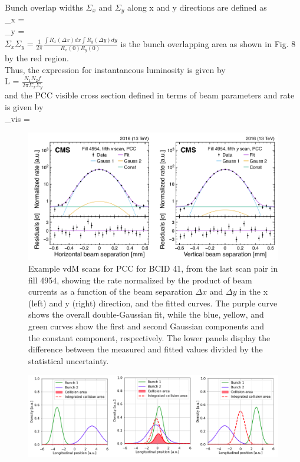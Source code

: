 Bunch overlap widths $\Sigma_x$ and $\Sigma_y$ along x and y directions are defined as \\

\Sigma_x =   \\

\Sigma_y =    \\

$\Sigma_x \Sigma_y = \frac{1}{2 \pi} \frac{\int R_x(\Delta x)dx \int R_y(\Delta y) dy}{R_x(0) R_y(0)}$  is the bunch overlapping area as shown in Fig. 8 by the red region.\\

Thus, the expression for instantaneous luminosity is given by \\

L = $\frac{N_1 N_2 f}{2\pi \Sigma_x \Sigma_y}$ \\

and the PCC visible cross section defined in terms of beam parameters and rate is given by \\

\sigma_{vis} =  \\


\begin{figure}[H]
  \centering
  \includegraphics[width=0.7\columnwidth]{./vdmfit.png}
  \caption{ \onehalfspacing Example vdM scans for PCC for BCID 41, from the last scan pair in fill 4954, showing the rate normalized by the product of beam currents as a function of the beam separation $\Delta x$ and $\Delta y$ in the x (left) and y (right) direction, and the fitted curves. The purple curve shows the overall double-Gaussian fit, while the blue, yellow, and green curves show the first and second Gaussian components and the constant component, respectively. The lower panels display the difference between the measured and fitted values
divided by the statistical uncertainty\cite{}.}
  \label{fig:CMS}
\end{figure}


\begin{figure}[H]
  \centering
  \includegraphics[width=\columnwidth]{./vdm_image.png}
  \caption{ \onehalfspacing }
  \label{fig:CMS}
\end{figure}




